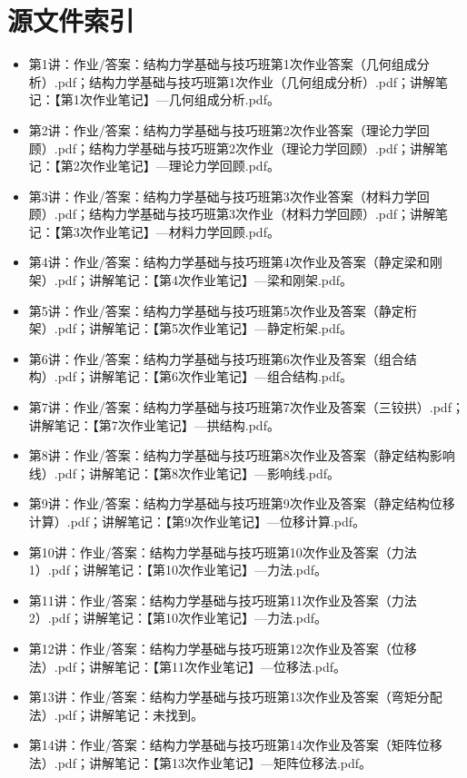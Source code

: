 \documentclass[UTF8,12pt,a4paper,openany]{ctexbook}
\begin{document}
\chapter*{源文件索引}
\begin{itemize}
\item 第1讲：作业/答案：结构力学基础与技巧班第1次作业答案（几何组成分析）.pdf；结构力学基础与技巧班第1次作业（几何组成分析）.pdf；讲解笔记：【第1次作业笔记】—几何组成分析.pdf。
\item 第2讲：作业/答案：结构力学基础与技巧班第2次作业答案（理论力学回顾）.pdf；结构力学基础与技巧班第2次作业（理论力学回顾）.pdf；讲解笔记：【第2次作业笔记】—理论力学回顾.pdf。
\item 第3讲：作业/答案：结构力学基础与技巧班第3次作业答案（材料力学回顾）.pdf；结构力学基础与技巧班第3次作业（材料力学回顾）.pdf；讲解笔记：【第3次作业笔记】—材料力学回顾.pdf。
\item 第4讲：作业/答案：结构力学基础与技巧班第4次作业及答案（静定梁和刚架）.pdf；讲解笔记：【第4次作业笔记】—梁和刚架.pdf。
\item 第5讲：作业/答案：结构力学基础与技巧班第5次作业及答案（静定桁架）.pdf；讲解笔记：【第5次作业笔记】—静定桁架.pdf。
\item 第6讲：作业/答案：结构力学基础与技巧班第6次作业及答案（组合结构）.pdf；讲解笔记：【第6次作业笔记】—组合结构.pdf。
\item 第7讲：作业/答案：结构力学基础与技巧班第7次作业及答案（三铰拱）.pdf；讲解笔记：【第7次作业笔记】—拱结构.pdf。
\item 第8讲：作业/答案：结构力学基础与技巧班第8次作业及答案（静定结构影响线）.pdf；讲解笔记：【第8次作业笔记】—影响线.pdf。
\item 第9讲：作业/答案：结构力学基础与技巧班第9次作业及答案（静定结构位移计算）.pdf；讲解笔记：【第9次作业笔记】—位移计算.pdf。
\item 第10讲：作业/答案：结构力学基础与技巧班第10次作业及答案（力法1）.pdf；讲解笔记：【第10次作业笔记】—力法.pdf。
\item 第11讲：作业/答案：结构力学基础与技巧班第11次作业及答案（力法2）.pdf；讲解笔记：【第10次作业笔记】—力法.pdf。
\item 第12讲：作业/答案：结构力学基础与技巧班第12次作业及答案（位移法）.pdf；讲解笔记：【第11次作业笔记】—位移法.pdf。
\item 第13讲：作业/答案：结构力学基础与技巧班第13次作业及答案（弯矩分配法）.pdf；讲解笔记：未找到。
\item 第14讲：作业/答案：结构力学基础与技巧班第14次作业及答案（矩阵位移法）.pdf；讲解笔记：【第13次作业笔记】—矩阵位移法.pdf。
\end{itemize}
\end{document}
